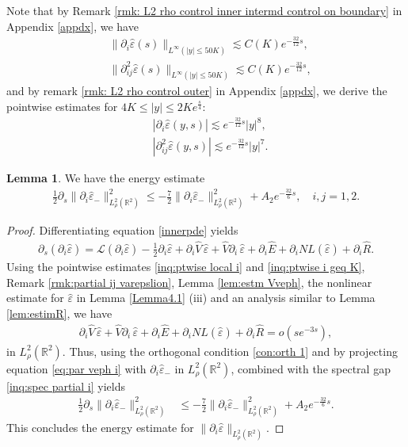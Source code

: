 \documentclass[11pt,reqno]{amsart}
\theoremstyle{definition}
\theoremstyle{bfremark}
\newtheorem{lemma}{Lemma}[section]
\numberwithin{equation}{section}
\newcommand{\veph}{\hat\varepsilon }
\begin{document}
Note that by Remark \ref{rmk: L2 rho control inner intermd control on boundary} in Appendix \ref{appdx}, we have
\begin{align}
    &\|\partial_i\veph(s)\|_{L^{\infty}(|y| \leq 50K)} \lesssim C(K) e^{-\frac{32}{12}s},\label{inq:ptwise local i}\\
    &\|\partial^2_{ij}\veph(s)\|_{L^{\infty}(|y| \leq 50K)} \lesssim C(K)e^{-\frac{32}{12}s},\label{inq:ptwise local ij}
\end{align}
and by remark \ref{rmk: L2 rho control outer} in Appendix \ref{appdx}, we derive the pointwise estimates for \(4K \leq |y| \leq 2Ke^{\frac{s}{4}}\):
\begin{align}
    &|\partial_i\veph(y,s)| \lesssim  e^{-\frac{32}{12}s}|y|^8,\label{inq:ptwise i geq K}\\
    & |\partial^2_{ij}\veph(y,s)|  \lesssim  e^{-\frac{32}{12}s}|y|^7.\label{inq:ptwise ij geq K}
\end{align}

\begin{lemma}
\label{lem:energy par i veph}
    We have the energy estimate
    \begin{align}
        \frac{1}{2}\partial_s\|\partial_i\veph_-\|^2_{L^2_{\rho}(\mathbb{R}^2)} \leq -\frac{7}{2}\|\partial_i\veph_-\|^2_{L^2_{\rho}(\mathbb{R}^2)}+A_2e^{-\frac{32}{6}s}, \quad i,j=1,2.\label{en6}
    \end{align}
\end{lemma}
\begin{proof}
    Differentiating equation \ref{innerpde} yields
    \begin{align}
    \label{eq:par veph i}
        \partial_s(\partial_i\veph)=\mathcal{L}(\partial_i\veph)-\frac{1}{2}\partial_i \veph+\partial_i\hat{V}\,\veph+\hat{V}\partial_i\,\veph+\partial_i \hat{E}+\partial_iNL(\veph)+\partial_i\hat{R}.
    \end{align}
    Using the pointwise estimates \ref{inq:ptwise local i} and \ref{inq:ptwise i geq K}, Remark \ref{rmk:partial ij varepslion}, Lemma \ref{lem:estm Vveph}, the nonlinear estimate for \(\veph\) in Lemma \ref{Lemma4.1} (iii) and an analysis similar to Lemma \ref{lem:estimR}, we have
    \begin{align*}
    \partial_i\hat{V}\,\veph+\hat{V}\partial_i\,\veph+\partial_i \hat{E}+\partial_iNL(\veph)+\partial_i\hat{R}=o(se^{-3s}),
    \end{align*}
    in \(L^2_{\rho}(\mathbb{R}^2)\). Thus, using the orthogonal condition \ref{con:orth 1} and by projecting equation \ref{eq:par veph i} with \(\partial_i\veph_-\) in \(L^2_{\rho}(\mathbb{R}^2)\), combined with the spectral gap \ref{inq:spec partial i} yields
    \begin{align*}
        \frac{1}{2}\partial_s\|\partial_i\veph_-\|^2_{L^2_{\rho}(\mathbb{R}^2)} 
        & \leq -\frac{7}{2}\|\partial_i\veph_-\|^2_{L^2_{\rho}(\mathbb{R}^2)}+A_2e^{-\frac{32}{6}s}.
    \end{align*}
    This concludes the energy estimate for \(\|\partial_i\veph\|_{L^2_{\rho}(\mathbb{R}^2)}\).
\end{proof}
\end{document}
